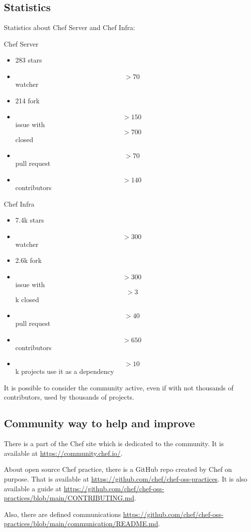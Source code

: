 \documentclass[12pt,a4paper,openright,twoside]{book}
\begin{document}
\subsection{Statistics}
Statistics about Chef Server and Chef Infra:


Chef Server


\begin{itemize}
    \item 283 stars
    \item \[>70\] watcher
    \item 214 fork
    \item \[>150\] issue with \[>700\] closed
    \item \[>70\] pull request
    \item \[>140\] contributors
\end{itemize}


Chef Infra


\begin{itemize}
    \item 7.4k stars
    \item \[>300\] watcher
    \item 2.6k fork
    \item \[>300\] issue with \[>3\]k closed
    \item \[>40\] pull request
    \item \[>650\] contributors
    \item \[>10\]k projects use it as a dependency
\end{itemize}

It is possible to consider the community active, even if with not thousands of contributors, used by thousands of projects.


\subsection{Community way to help and improve}
There is a part of the Chef site which is dedicated to the community.
It is available at \url{https://community.chef.io/}.


About open source Chef practice, there is a GitHub repo created by Chef on purpose.
That is available at \url{https://github.com/chef/chef-oss-practices}. It is also available a guide at \url{https://github.com/chef/chef-oss-practices/blob/main/CONTRIBUTING.md}.


Also, there are defined communications \url{https://github.com/chef/chef-oss-practices/blob/main/communication/README.md}.
\end{document}
